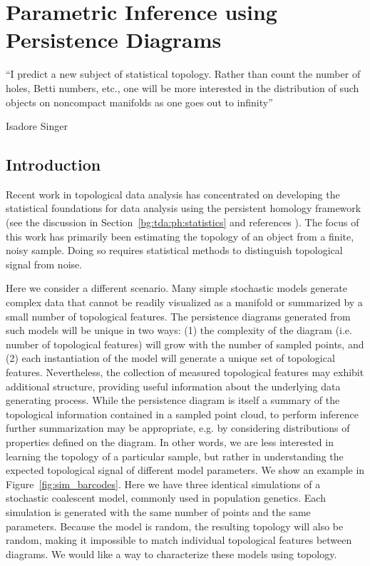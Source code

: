 \chapter{Parametric Inference using Persistence Diagrams}
\label{ch:parametric_inference}

\epigraph{``I predict a new subject of statistical topology. Rather than count the
number of holes, Betti numbers, etc., one will be more interested in the
distribution of such objects on noncompact manifolds as one goes out
to infinity''}{Isadore Singer}

\section{Introduction}

Recent work in topological data analysis has concentrated on developing the statistical foundations for data analysis using the persistent homology framework (see the discussion in Section~\ref{bg:tda:ph:statistics} and references \cite{Fasy:2014,Blumberg:2014bq,Chazal:2014vl}).
The focus of this work has primarily been estimating the topology of an object from a finite, noisy sample.
Doing so requires statistical methods to distinguish topological signal from noise.

Here we consider a different scenario.
Many simple stochastic models generate complex data that cannot be readily visualized as a manifold or summarized by a small number of topological features.
The persistence diagrams generated from such models will be unique in two ways: (1) the complexity of the diagram (i.e. number of topological features) will grow with the number of sampled points, and (2) each instantiation of the model will generate a unique set of topological features.
Nevertheless, the collection of measured topological features may exhibit additional structure, providing useful information about the underlying data generating process.
While the persistence diagram is itself a summary of the topological information contained in a sampled point cloud, to perform inference further summarization may be appropriate, e.g. by considering distributions of properties defined on the diagram.
In other words, we are less interested in learning the topology of a particular sample, but rather in understanding the expected topological signal of different model parameters.
We show an example in Figure~\ref{fig:sim_barcodes}.
Here we have three identical simulations of a stochastic coalescent model, commonly used in population genetics.
Each simulation is generated with the same number of points and the same parameters.
Because the model is random, the resulting topology will also be random, making it impossible to match individual topological features between diagrams.
We would like a way to characterize these models using topology.

